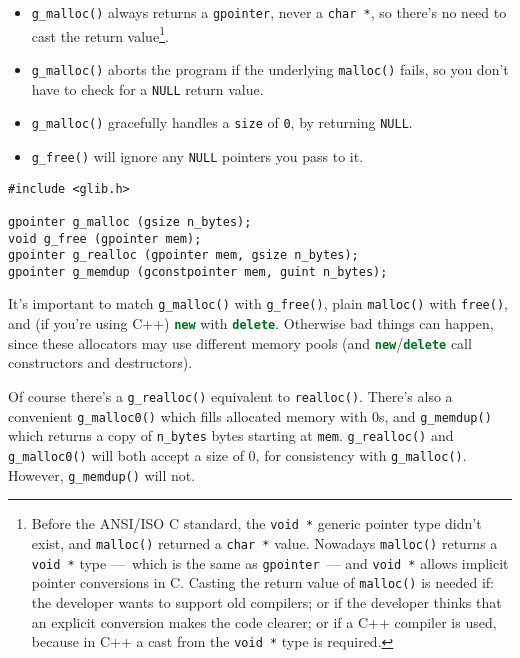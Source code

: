 \begin{itemize}
  \item \lstinline{g_malloc()} always returns a \lstinline{gpointer}, never a \lstinline{char *}, so there's no need to cast the return value\footnote{Before the ANSI/ISO C standard, the \lstinline{void *} generic pointer type didn't exist, and \lstinline{malloc()} returned a \lstinline{char *} value. Nowadays \lstinline{malloc()} returns a \lstinline{void *} type ---~which is the same as \lstinline{gpointer}~--- and \lstinline{void *} allows implicit pointer conversions in C. Casting the return value of \lstinline{malloc()} is needed if: the developer wants to support old compilers; or if the developer thinks that an explicit conversion makes the code clearer; or if a C++ compiler is used, because in C++ a cast from the \lstinline{void *} type is required.}.

  \item \lstinline{g_malloc()} aborts the program if the underlying \lstinline{malloc()} fails, so you don't have to check for a \lstinline{NULL} return value.

  \item \lstinline{g_malloc()} gracefully handles a \lstinline{size} of \lstinline{0}, by returning \lstinline{NULL}.

  \item \lstinline{g_free()} will ignore any \lstinline{NULL} pointers you pass to it.
\end{itemize}

\begin{lstlisting}[float, caption={GLib memory allocation}, label=glib-malloc-free]
#include <glib.h>

gpointer g_malloc (gsize n_bytes);
void g_free (gpointer mem);
gpointer g_realloc (gpointer mem, gsize n_bytes);
gpointer g_memdup (gconstpointer mem, guint n_bytes);
\end{lstlisting}

It's important to match \lstinline{g_malloc()} with \lstinline{g_free()}, plain \lstinline{malloc()} with \lstinline{free()}, and (if you're using C++) \lstinline[language=C++]{new} with \lstinline[language=C++]{delete}. Otherwise bad things can happen, since these allocators may use different memory pools (and \lstinline[language=C++]{new}/\lstinline[language=C++]{delete} call constructors and destructors).

Of course there's a \lstinline{g_realloc()} equivalent to \lstinline{realloc()}. There's also a convenient \lstinline{g_malloc0()} which fills allocated memory with 0s, and \lstinline{g_memdup()} which returns a copy of \lstinline{n_bytes} bytes starting at \lstinline{mem}. \lstinline{g_realloc()} and \lstinline{g_malloc0()} will both accept a size of 0, for consistency with \lstinline{g_malloc()}. However, \lstinline{g_memdup()} will not.

